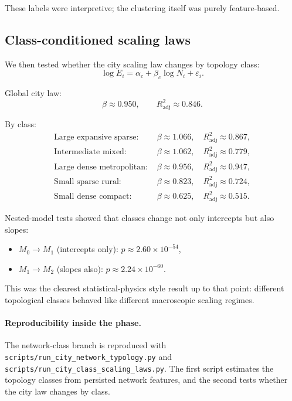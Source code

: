\documentclass[11pt]{article}
\newcommand{\adjR}{R^2_{\mathrm{adj}}}
\begin{document}
These labels were interpretive; the clustering itself was purely feature-based.

\subsection{Class-conditioned scaling laws}

We then tested whether the city scaling law changes by topology class:
\begin{equation}
\log E_i = \alpha_c + \beta_c \log N_i + \varepsilon_i.
\end{equation}

Global city law:
\begin{equation}
\beta \approx 0.950,
\qquad
\adjR \approx 0.846.
\end{equation}

By class:
\begin{align}
\text{Large expansive sparse: } & \beta \approx 1.066,\quad \adjR \approx 0.867,\\
\text{Intermediate mixed: } & \beta \approx 1.062,\quad \adjR \approx 0.779,\\
\text{Large dense metropolitan: } & \beta \approx 0.956,\quad \adjR \approx 0.947,\\
\text{Small sparse rural: } & \beta \approx 0.823,\quad \adjR \approx 0.724,\\
\text{Small dense compact: } & \beta \approx 0.625,\quad \adjR \approx 0.515.
\end{align}

Nested-model tests showed that classes change not only intercepts but also slopes:
\begin{itemize}
\item \(M_0 \to M_1\) (intercepts only): \(p \approx 2.60\times 10^{-54}\),
\item \(M_1 \to M_2\) (slopes also): \(p \approx 2.24\times 10^{-60}\).
\end{itemize}

This was the clearest statistical-physics style result up to that point: different topological classes behaved like different macroscopic scaling regimes.

\paragraph{Reproducibility inside the phase.}
The network-class branch is reproduced with
\texttt{scripts/run\_city\_network\_typology.py}
and
\texttt{scripts/run\_city\_class\_scaling\_laws.py}.
The first script estimates the topology classes from persisted network features, and the second tests whether the city law changes by class.
\end{document}
